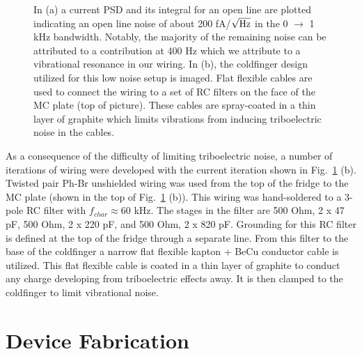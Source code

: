 \begin{figure}[h]
\centering
{}
\caption{In (a) a current \ac{PSD} and its integral for an open line are plotted indicating an open line noise of about 200 fA/$\sqrt{\textnormal{Hz}}$ in the 0 $\to$ 1 kHz bandwidth. Notably, the majority of the remaining noise can be attributed to a contribution at 400 Hz which we attribute to a vibrational resonance in our wiring. In (b), the coldfinger design utilized for this low noise setup is imaged. Flat flexible cables are used to connect the wiring to a set of RC filters on the face of the MC plate (top of picture). These cables are spray-coated in a thin layer of graphite which limits vibrations from inducing triboelectric noise in the cables.}
\label{fig:noise}       
\end{figure}

As a consequence of the difficulty of limiting triboelectric noise, a number of iterations of wiring were developed with the current iteration shown in Fig.~\ref{fig:noise} (b). Twisted pair Ph-Br unshielded wiring was used from the top of the fridge to the \ac{MC} plate (shown in the top of Fig.~\ref{fig:noise} (b)). This wiring was hand-soldered to a 3-pole RC filter with $f_{char} \approx 60$ kHz. The stages in the filter are 500 Ohm, 2 x 47 pF, 500 Ohm, 2 x 220 pF, and 500 Ohm, 2 x 820 pF. Grounding for this RC filter is defined at the top of the fridge through a separate line. From this filter to the base of the coldfinger a narrow flat flexible kapton + BeCu conductor cable is utilized. This flat flexible cable is coated in a thin layer of graphite to conduct any charge developing from triboelectric effects away. It is then clamped to the coldfinger to limit vibrational noise. 


\chapter{Device Fabrication}

